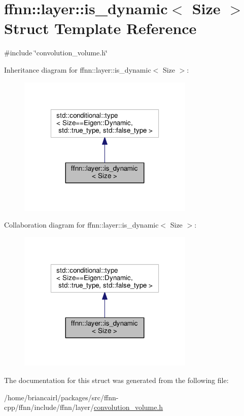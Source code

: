 \hypertarget{structffnn_1_1layer_1_1is__dynamic}{\section{ffnn\-:\-:layer\-:\-:is\-\_\-dynamic$<$ Size $>$ Struct Template Reference}
\label{structffnn_1_1layer_1_1is__dynamic}
}


{\ttfamily \#include \char`\"{}convolution\-\_\-volume.\-h\char`\"{}}



Inheritance diagram for ffnn\-:\-:layer\-:\-:is\-\_\-dynamic$<$ Size $>$\-:\nopagebreak
\begin{figure}[H]
\begin{center}
\leavevmode
\includegraphics[width=238pt]{structffnn_1_1layer_1_1is__dynamic__inherit__graph}
\end{center}
\end{figure}


Collaboration diagram for ffnn\-:\-:layer\-:\-:is\-\_\-dynamic$<$ Size $>$\-:\nopagebreak
\begin{figure}[H]
\begin{center}
\leavevmode
\includegraphics[width=238pt]{structffnn_1_1layer_1_1is__dynamic__coll__graph}
\end{center}
\end{figure}


The documentation for this struct was generated from the following file\-:\begin{DoxyCompactItemize}
\item 
/home/briancairl/packages/src/ffnn-\/cpp/ffnn/include/ffnn/layer/\hyperlink{convolution__volume_8h}{convolution\-\_\-volume.\-h}\end{DoxyCompactItemize}
